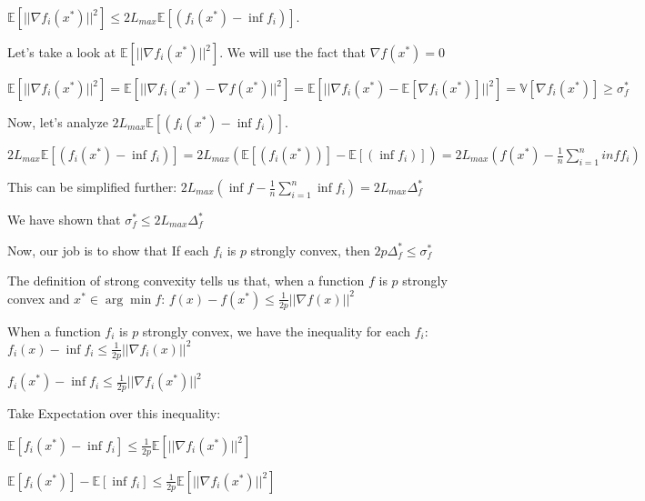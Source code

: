 $\mathbb{E}[||\nabla f_i(x^*)||^2] \leq 2L_{max}  \mathbb{E}[(f_i(x^*) - \inf f_i)]$. 

Let's take a look at $\mathbb{E}[||\nabla f_i(x^*)||^2]$. We will use the fact that $\nabla f(x^*) = 0$

$\mathbb{E}[||\nabla f_i(x^*)||^2]  =  \mathbb{E}[||\nabla f_i(x^*) - \nabla f(x^*)||^2] = \mathbb{E}[||\nabla f_i(x^*) - \mathbb{E}[\nabla f_i(x^*)]||^2] = \mathbb{V}[\nabla f_i(x^*)]  \geq \sigma_f^*$ \newline 

Now, let's analyze $2L_{max}  \mathbb{E}[(f_i(x^*) - \inf f_i)]$. \newline 

$2L_{max}  \mathbb{E}[(f_i(x^*) - \inf f_i)] = 2L_{max} (\mathbb{E}[(f_i(x^*))] - \mathbb{E}[(\inf f_i)]) = 2L_{max} (f(x^*) - \frac{1}{n} \sum_{i=1}^{n} inf f_i)$

This can be simplified further: \newline 
$2L_{max} (\inf f - \frac{1}{n} \sum_{i=1}^{n} \inf f_i) = 2L_{max} \Delta^*_f$ \newline 

We have shown that $\sigma_f^* \leq 2L_{max} \Delta^*_f$


Now, our job is to show that If each $f_i$ is $p$ strongly convex, then $2p\Delta^*_f \leq \sigma_f^*$ \newline 

The definition of strong convexity tells us that, when a function $f$ is $p$ strongly convex and $x^* \in \arg \min f$: \newline 
$f(x) - f(x^*) \leq \frac{1}{2p} ||\nabla f(x)||^2$


When a function $f_i$ is $p$ strongly convex, we have the inequality for each $f_i$: \newline 
$f_i(x) - \inf f_i \leq \frac{1}{2p} ||\nabla f_i(x)||^2$ \newline 

$f_i(x^*) - \inf f_i \leq \frac{1}{2p} ||\nabla f_i(x^*)||^2$

Take Expectation over this inequality: \newline 

$\mathbb{E} [f_i(x^*) - \inf f_i] \leq \frac{1}{2p} \mathbb{E} [||\nabla f_i(x^*)||^2]$ \newline 

$\mathbb{E} [f_i(x^*)] - \mathbb{E} [\inf f_i] \leq \frac{1}{2p} \mathbb{E} [||\nabla f_i(x^*)||^2]$ \newline 

